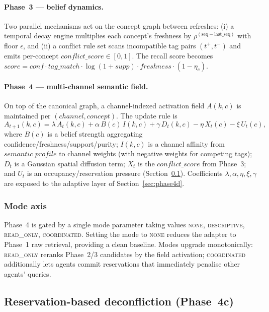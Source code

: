 \paragraph{Phase~3 — belief dynamics.}
Two parallel mechanisms act on the concept graph between refreshes:
(i) a temporal decay engine multiplies each concept's freshness by
$\rho^{(\text{seq}-\text{last\_seq})}$ with floor $\epsilon$, and
(ii) a conflict rule set scans incompatible tag pairs
$(t^+, t^-)$ and emits per-concept $conflict\_score \in [0,1]$.  The
recall score becomes
$score = conf \cdot tag\_match \cdot \log(1+supp) \cdot freshness \cdot (1-\eta_c)$.

\paragraph{Phase~4 — multi-channel semantic field.}
On top of the canonical graph, a channel-indexed activation field
$A(k,c)$ is maintained per $(channel, concept)$.  The update rule is
\begin{equation}
\label{eq:field-update}
A_{t+1}(k,c) = \lambda\,A_t(k,c)
              + \alpha\,B(c)\,I(k,c)
              + \gamma\,D_t(k,c)
              - \eta\,X_t(c)
              - \xi\,U_t(c),
\end{equation}
where $B(c)$ is a belief strength aggregating confidence/freshness/support/purity;
$I(k,c)$ is a channel affinity from $semantic\_profile$ to channel
weights (with negative weights for competing tags); $D_t$ is a Gaussian
spatial diffusion term; $X_t$ is the $conflict\_score$ from Phase~3;
and $U_t$ is an occupancy/reservation pressure (Section~\ref{sec:phase4c}).
Coefficients $\lambda,\alpha,\eta,\xi,\gamma$ are exposed to the
adaptive layer of Section~\ref{sec:phase4d}.

\subsubsection{Mode axis}

Phase~4 is gated by a single mode parameter taking values
\textsc{none}, \textsc{descriptive}, \textsc{read\_only},
\textsc{coordinated}.  Setting the mode to \textsc{none} reduces the
adapter to Phase~1 raw retrieval, providing a clean baseline.  Modes
upgrade monotonically: \textsc{read\_only} reranks Phase~2/3 candidates
by the field activation; \textsc{coordinated} additionally lets agents
commit reservations that immediately penalise other agents' queries.

\subsection{Reservation-based deconfliction (Phase~4c)}
\label{sec:phase4c}

